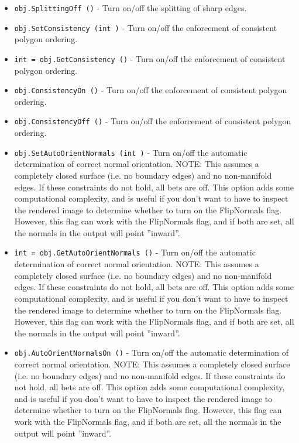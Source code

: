 \begin{itemize}
\item  \verb|obj.SplittingOff ()| -  Turn on/off the splitting of sharp edges.

\item  \verb|obj.SetConsistency (int )| -  Turn on/off the enforcement of consistent polygon ordering.

\item  \verb|int = obj.GetConsistency ()| -  Turn on/off the enforcement of consistent polygon ordering.

\item  \verb|obj.ConsistencyOn ()| -  Turn on/off the enforcement of consistent polygon ordering.

\item  \verb|obj.ConsistencyOff ()| -  Turn on/off the enforcement of consistent polygon ordering.

\item  \verb|obj.SetAutoOrientNormals (int )| -  Turn on/off the automatic determination of correct normal
 orientation. NOTE: This assumes a completely closed surface
 (i.e. no boundary edges) and no non-manifold edges. If these
 constraints do not hold, all bets are off. This option adds some
 computational complexity, and is useful if you don't want to have
 to inspect the rendered image to determine whether to turn on the 
 FlipNormals flag. However, this flag can work with the FlipNormals 
 flag, and if both are set, all the normals in the output will 
 point ''inward''.

\item  \verb|int = obj.GetAutoOrientNormals ()| -  Turn on/off the automatic determination of correct normal
 orientation. NOTE: This assumes a completely closed surface
 (i.e. no boundary edges) and no non-manifold edges. If these
 constraints do not hold, all bets are off. This option adds some
 computational complexity, and is useful if you don't want to have
 to inspect the rendered image to determine whether to turn on the 
 FlipNormals flag. However, this flag can work with the FlipNormals 
 flag, and if both are set, all the normals in the output will 
 point ''inward''.

\item  \verb|obj.AutoOrientNormalsOn ()| -  Turn on/off the automatic determination of correct normal
 orientation. NOTE: This assumes a completely closed surface
 (i.e. no boundary edges) and no non-manifold edges. If these
 constraints do not hold, all bets are off. This option adds some
 computational complexity, and is useful if you don't want to have
 to inspect the rendered image to determine whether to turn on the 
 FlipNormals flag. However, this flag can work with the FlipNormals 
 flag, and if both are set, all the normals in the output will 
 point ''inward''.


\end{itemize}
